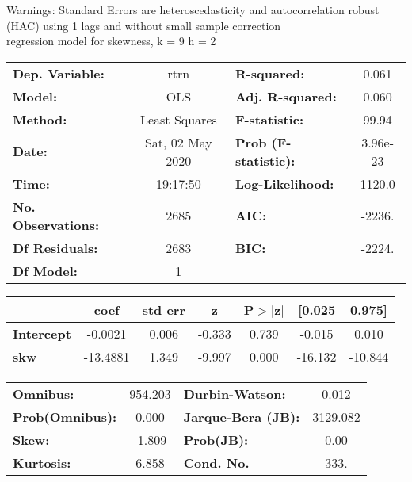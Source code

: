Warnings: \newline
 [1] Standard Errors are heteroscedasticity and autocorrelation robust (HAC) using 1 lags and without small sample correction\\ 

regression model for skewness, k = 9 h = 2\begin{center}
\begin{tabular}{lclc}
\toprule
\textbf{Dep. Variable:}    &       rtrn       & \textbf{  R-squared:         } &     0.061   \\
\textbf{Model:}            &       OLS        & \textbf{  Adj. R-squared:    } &     0.060   \\
\textbf{Method:}           &  Least Squares   & \textbf{  F-statistic:       } &     99.94   \\
\textbf{Date:}             & Sat, 02 May 2020 & \textbf{  Prob (F-statistic):} &  3.96e-23   \\
\textbf{Time:}             &     19:17:50     & \textbf{  Log-Likelihood:    } &    1120.0   \\
\textbf{No. Observations:} &        2685      & \textbf{  AIC:               } &    -2236.   \\
\textbf{Df Residuals:}     &        2683      & \textbf{  BIC:               } &    -2224.   \\
\textbf{Df Model:}         &           1      & \textbf{                     } &             \\
\bottomrule
\end{tabular}
\begin{tabular}{lcccccc}
                   & \textbf{coef} & \textbf{std err} & \textbf{z} & \textbf{P$> |$z$|$} & \textbf{[0.025} & \textbf{0.975]}  \\
\midrule
\textbf{Intercept} &      -0.0021  &        0.006     &    -0.333  &         0.739        &       -0.015    &        0.010     \\
\textbf{skw}       &     -13.4881  &        1.349     &    -9.997  &         0.000        &      -16.132    &      -10.844     \\
\bottomrule
\end{tabular}
\begin{tabular}{lclc}
\textbf{Omnibus:}       & 954.203 & \textbf{  Durbin-Watson:     } &    0.012  \\
\textbf{Prob(Omnibus):} &   0.000 & \textbf{  Jarque-Bera (JB):  } & 3129.082  \\
\textbf{Skew:}          &  -1.809 & \textbf{  Prob(JB):          } &     0.00  \\
\textbf{Kurtosis:}      &   6.858 & \textbf{  Cond. No.          } &     333.  \\
\bottomrule
\end{tabular}
\end{center}

